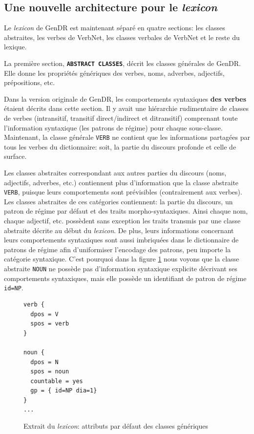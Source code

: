 \subsection{Une nouvelle architecture pour le \emph{lexicon}}

Le \emph{lexicon} de GenDR est maintenant séparé en quatre sections: les classes abstraites, les verbes de VerbNet, les classes verbales de VerbNet et le reste du lexique.

La première section, \textbf{\texttt{ABSTRACT CLASSES}}, décrit les classes générales de GenDR. Elle donne les propriétés génériques des verbes, noms, adverbes, adjectifs, prépositions, etc.

Dans la version originale de GenDR, les comportements syntaxiques \textbf{des verbes} étaient décrits dans cette section. Il y avait une hiérarchie rudimentaire de classes de verbes (intransitif, transitif direct/indirect et ditransitif) comprenant toute l'information syntaxique (les patrons de régime) pour chaque sous-classe. Maintenant, la classe générale \texttt{VERB} ne contient que les informations partagées par tous les verbes du dictionnaire: soit, la partie du discours profonde et celle de surface. 

Les classes abstraites correspondant aux autres parties du discours (noms, adjectifs, adverbes, etc.) contiennent plus d'information que la classe abstraite \texttt{VERB}, puisque leurs comportements sont prévisibles (contrairement aux verbes). Les classes abstraites de ces catégories contiennent: la partie du discours, un patron de régime par défaut et des traits morpho-syntaxiques. Ainsi chaque nom, chaque adjectif, etc. possèdent sans exception les traits transmis par une classe abstraite décrite au début du \emph{lexicon}. De plus, leurs informations concernant leurs comportements syntaxiques sont aussi imbriquées dans le dictionnaire de patrons de régime afin d'uniformiser l'encodage des patrons, peu importe la catégorie syntaxique. C'est pourquoi dans la figure \ref{classedef} nous voyons que la classe abstraite \texttt{NOUN} ne possède pas d'information syntaxique explicite décrivant ses comportements syntaxiques, mais elle possède un identifiant de patron de régime \texttt{id=NP}.

\begin{figure}[htb]
\begin{lstlisting}[language=mate]
verb {
  dpos = V
  spos = verb
}

noun {
  dpos = N
  spos = noun
  countable = yes
  gp = { id=NP dia=1}
}
...
\end{lstlisting}
  \caption{Extrait du \emph{lexicon}: attributs par défaut des classes génériques}
	\label{classedef}
\end{figure}

